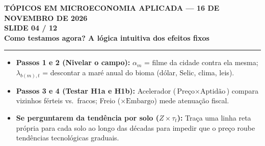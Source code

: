 \documentclass[11pt,a4paper]{article}
\newcommand{\slidenum}{1}
\begin{document}
\renewcommand{\slidenum}{4}
\noindent
\begin{minipage}{\textwidth}
\begin{center}
{\color{cinza}\footnotesize\textbf{TÓPICOS EM MICROECONOMIA APLICADA --- 16 DE NOVEMBRO DE 2026}\\[1.2mm]}
{\color{cinza}\bfseries\Large SLIDE 04 / 12\\[1.5mm]}
{\color{verde}\bfseries\LARGE Como testamos agora? A lógica intuitiva dos efeitos fixos\\[2.5mm]}
\rule{\textwidth}{1pt}
\end{center}
\end{minipage}
\vspace{1.5mm}

\begin{tcolorbox}[title={\bfseries\small ÂNCORAS DO SLIDE}]
\begin{itemize}[leftmargin=*,itemsep=1mm,topsep=0.5mm]
    \item \textbf{Passos 1 e 2 (Nivelar o campo):} $\alpha_m$ = filme da cidade contra ela mesma; $\lambda_{b(m),t}$ = descontar a maré anual do bioma (dólar, Selic, clima, leis).
    \item \textbf{Passos 3 e 4 (Testar H1a e H1b):} Acelerador ($\text{Preço} \times \text{Aptidão}$) compara vizinhos férteis vs.\ fracos; Freio ($\times \text{Embargo}$) mede atenuação fiscal.
    \item \textbf{Se perguntarem da tendência por solo ($Z \times \tau_t$):} Traça uma linha reta própria para cada solo ao longo das décadas para impedir que o preço roube tendências tecnológicas graduais.
\end{itemize}
\end{tcolorbox}
\vspace{2mm}
\end{document}
